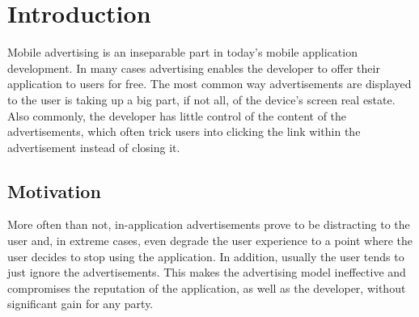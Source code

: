 

\chapter{Introduction}

\ifpdf
    \graphicspath{{1_introduction/figures/PNG/}{1_introduction/figures/PDF/}{1_introduction/figures/}}
\else
    \graphicspath{{1_introduction/figures/EPS/}{1_introduction/figures/}}
\fi





Mobile advertising is an inseparable part in today's mobile application development. In many cases advertising enables the developer to offer their application to users for free. The most common way advertisements are displayed to the user is taking up a big part, if not all, of the device's screen real estate. Also commonly, the developer has little control of the content of the advertisements, which often trick users into clicking the link within the advertisement instead of closing it.

\section{Motivation}
More often than not, in-application advertisements prove to be distracting to the user and, in extreme cases, even degrade the user experience to a point where the user decides to stop using the application.  In addition, usually the user tends to just ignore the advertisements. This makes the advertising model ineffective and compromises the reputation of the application, as well as the developer, without significant gain for any party.

